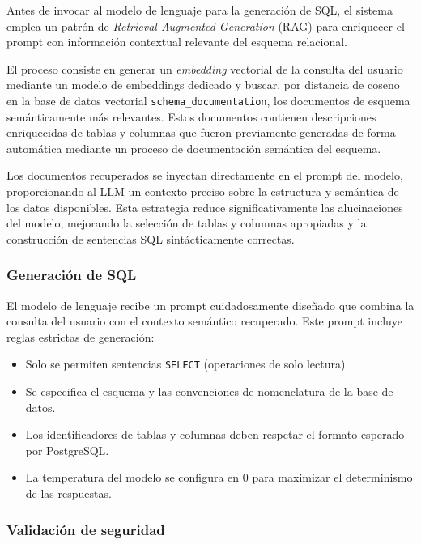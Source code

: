 Antes de invocar al modelo de lenguaje para la generación de SQL, el sistema
emplea un patrón de \textit{Retrieval-Augmented Generation} (RAG) para
enriquecer el prompt con información contextual relevante del esquema
relacional.

El proceso consiste en generar un \textit{embedding} vectorial de la consulta
del usuario mediante un modelo de embeddings dedicado y buscar, por distancia
de coseno en la base de datos vectorial \texttt{schema\_documentation}, los
documentos de esquema semánticamente más relevantes. Estos documentos
contienen descripciones enriquecidas de tablas y columnas que fueron
previamente generadas de forma automática mediante un proceso de documentación
semántica del esquema.

Los documentos recuperados se inyectan directamente en el prompt del modelo,
proporcionando al LLM un contexto preciso sobre la estructura y semántica de
los datos disponibles. Esta estrategia reduce significativamente las
alucinaciones del modelo, mejorando la selección de tablas y columnas
apropiadas y la construcción de sentencias SQL sintácticamente correctas.

\subsubsection{Generación de SQL}

El modelo de lenguaje recibe un prompt cuidadosamente diseñado que combina la
consulta del usuario con el contexto semántico recuperado. Este prompt incluye
reglas estrictas de generación:

\begin{itemize}
      \item Solo se permiten sentencias \texttt{SELECT} (operaciones de solo
            lectura).
      \item Se especifica el esquema y las convenciones de nomenclatura de la base
            de datos.
      \item Los identificadores de tablas y columnas deben respetar el formato
            esperado por PostgreSQL.
      \item La temperatura del modelo se configura en 0 para maximizar el
            determinismo de las respuestas.
\end{itemize}

\subsubsection{Validación de seguridad}

